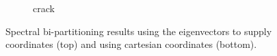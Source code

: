 \begin{figure}[H]
\begin{subfigure}{0.5\textwidth}
		\caption{crack}
		\label{fig:inert_crack}
	\end{subfigure}
	\caption{Spectral bi-partitioning results using the eigenvectors to supply coordinates (top) and using cartesian coordinates (bottom).}
	\label{fig:eig_spc}
\end{figure}


